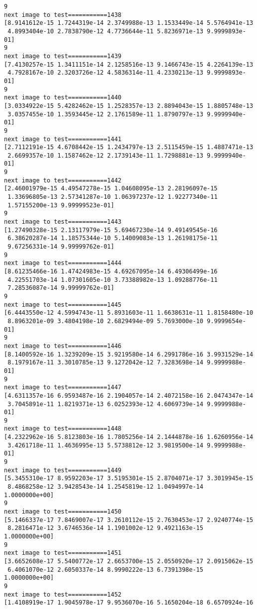 \documentclass[11pt]{article}
\begin{document}
\begin{Verbatim}[commandchars=\\\{\}]
9
next image to test===========1438
[8.9141612e-15 1.7244319e-14 2.3749988e-13 1.1533449e-14 5.5764941e-13
 4.8993404e-10 2.7838790e-12 4.7736644e-11 5.8236971e-13 9.9999893e-01]
9
next image to test===========1439
[7.4130257e-15 1.3411151e-14 2.1258516e-13 9.1466743e-15 4.2264139e-13
 4.7928167e-10 2.3203726e-12 4.5836314e-11 4.2330213e-13 9.9999893e-01]
9
next image to test===========1440
[3.0334922e-15 5.4282462e-15 1.2528357e-13 2.8894043e-15 1.8805748e-13
 3.0357455e-10 1.3593445e-12 2.1761589e-11 1.8790797e-13 9.9999940e-01]
9
next image to test===========1441
[2.7112191e-15 4.6708442e-15 1.2434797e-13 2.5115459e-15 1.4887471e-13
 2.6699357e-10 1.1587462e-12 2.1739143e-11 1.7298881e-13 9.9999940e-01]
9
next image to test===========1442
[2.46001979e-15 4.49547278e-15 1.04608095e-13 2.28196097e-15
 1.33696805e-13 2.57341287e-10 1.06397237e-12 1.92277340e-11
 1.57155200e-13 9.99999523e-01]
9
next image to test===========1443
[1.27490328e-15 2.13117979e-15 5.69467230e-14 9.49149545e-16
 6.38620287e-14 1.18575344e-10 5.14009083e-13 1.26198175e-11
 9.67256331e-14 9.99999762e-01]
9
next image to test===========1444
[8.61235466e-16 1.47424983e-15 4.69267095e-14 6.49306499e-16
 4.22551703e-14 1.07301605e-10 3.73388982e-13 1.09288776e-11
 7.28536087e-14 9.99999762e-01]
9
next image to test===========1445
[6.4443550e-12 4.5994743e-11 5.8931603e-11 1.6638631e-11 1.8158480e-10
 8.8963201e-09 3.4804198e-10 2.6829494e-09 5.7693000e-10 9.9999654e-01]
9
next image to test===========1446
[8.1400592e-16 1.3239209e-15 3.9219580e-14 6.2991786e-16 3.9931529e-14
 8.1979167e-11 3.3010785e-13 9.1272042e-12 7.3283698e-14 9.9999988e-01]
9
next image to test===========1447
[4.6311357e-16 6.9593487e-16 2.1904057e-14 2.4072158e-16 2.0474347e-14
 3.7045891e-11 1.8219371e-13 6.0252393e-12 4.6069739e-14 9.9999988e-01]
9
next image to test===========1448
[4.2322962e-16 5.8123803e-16 1.7805256e-14 2.1444878e-16 1.6260956e-14
 3.4261718e-11 1.4636995e-13 5.5738812e-12 3.9819500e-14 9.9999988e-01]
9
next image to test===========1449
[5.3455310e-17 8.9592203e-17 3.5195301e-15 2.8704071e-17 3.3019945e-15
 8.4868258e-12 3.9428543e-14 1.2545819e-12 1.0494997e-14 1.0000000e+00]
9
next image to test===========1450
[5.1466337e-17 7.8469007e-17 3.2610112e-15 2.7630453e-17 2.9240774e-15
 8.2816471e-12 3.6746536e-14 1.1901002e-12 9.4921163e-15 1.0000000e+00]
9
next image to test===========1451
[3.6652608e-17 5.5400772e-17 2.6653700e-15 2.0550920e-17 2.0915062e-15
 6.4061070e-12 2.6050337e-14 8.9990222e-13 6.7391398e-15 1.0000000e+00]
9
next image to test===========1452
[1.4108919e-17 1.9045978e-17 9.9536070e-16 5.1650204e-18 6.6570924e-16

\end{Verbatim}
\end{document}
